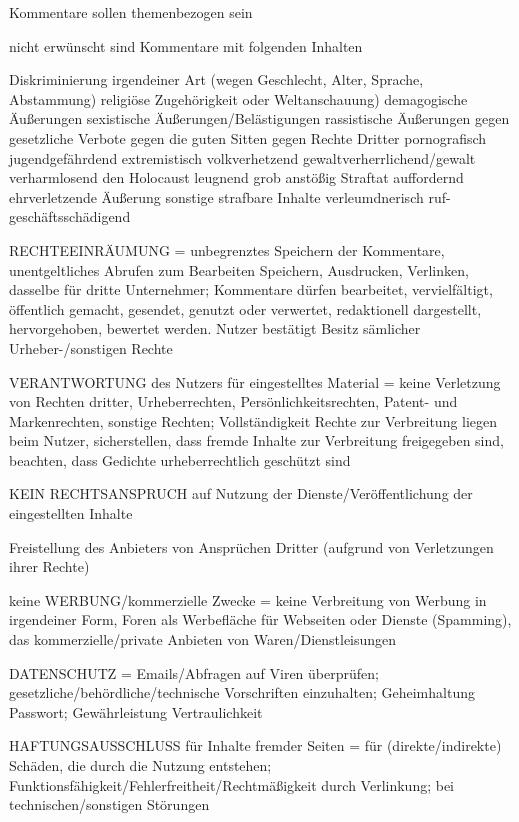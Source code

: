 Kommentare sollen themenbezogen sein

nicht erwünscht sind Kommentare mit folgenden Inhalten

Diskriminierung irgendeiner Art (wegen Geschlecht, Alter, Sprache, Abstammung) religiöse Zugehörigkeit oder Weltanschauung)
demagogische Äußerungen
sexistische Äußerungen/Belästigungen
rassistische Äußerungen 
gegen gesetzliche Verbote
gegen die guten Sitten 
gegen Rechte Dritter
pornografisch
jugendgefährdend
extremistisch
volkverhetzend
gewaltverherrlichend/gewalt verharmlosend
den Holocaust leugnend
grob anstößig
Straftat auffordernd 
ehrverletzende Äußerung
sonstige strafbare Inhalte
verleumdnerisch
ruf- geschäftsschädigend



RECHTEEINRÄUMUNG =
unbegrenztes Speichern der Kommentare, unentgeltliches Abrufen zum Bearbeiten Speichern, Ausdrucken, Verlinken, dasselbe für dritte Unternehmer; Kommentare dürfen bearbeitet, vervielfältigt, öffentlich gemacht, gesendet, genutzt oder verwertet, redaktionell dargestellt, hervorgehoben, bewertet werden.
Nutzer bestätigt Besitz sämlicher Urheber-/sonstigen Rechte


VERANTWORTUNG des Nutzers für eingestelltes Material =
keine Verletzung von Rechten dritter, Urheberrechten, Persönlichkeitsrechten, Patent- und Markenrechten, sonstige Rechten; Vollständigkeit
Rechte zur Verbreitung liegen beim Nutzer, sicherstellen, dass fremde Inhalte zur Verbreitung freigegeben sind, beachten, dass Gedichte urheberrechtlich geschützt sind

KEIN RECHTSANSPRUCH auf Nutzung der Dienste/Veröffentlichung der eingestellten Inhalte

Freistellung des Anbieters von Ansprüchen Dritter  (aufgrund von Verletzungen ihrer Rechte) 

keine WERBUNG/kommerzielle Zwecke =
keine Verbreitung von Werbung in irgendeiner Form, Foren als Werbefläche für Webseiten oder Dienste (Spamming), das kommerzielle/private Anbieten von Waren/Dienstleisungen

DATENSCHUTZ =
 Emails/Abfragen auf Viren überprüfen; gesetzliche/behördliche/technische Vorschriften einzuhalten; Geheimhaltung Passwort; Gewährleistung Vertraulichkeit

HAFTUNGSAUSSCHLUSS für Inhalte fremder Seiten = 
für (direkte/indirekte) Schäden, die durch die Nutzung entstehen; Funktionsfähigkeit/Fehlerfreitheit/Rechtmäßigkeit durch Verlinkung; bei technischen/sonstigen Störungen



